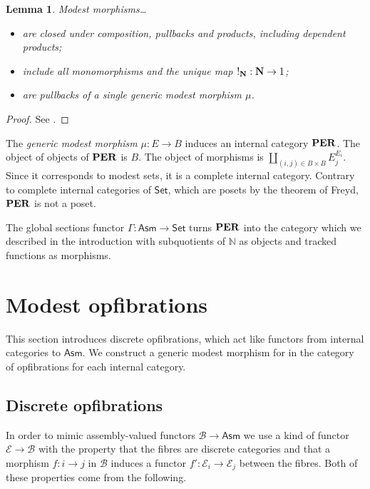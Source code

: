 \documentclass{amsart}
\theoremstyle{plain}
\newtheorem{lemma}[theorem]{Lemma}
\theoremstyle{definition}
\newcommand\hide[1]{}
\newcommand\cat\mathcal
\newcommand\Set{\mathsf{Set}}
\newcommand\N{\mathbb N}
\newcommand\Asm{\mathsf{Asm}}
\begin{document}
\begin{lemma} Modest morphisms\dots
\begin{itemize}
\item are closed under composition, pullbacks and products, including dependent products; 
\item include all monomorphisms and the unique map $!_\mathbf N:\mathbf N \to 1$;%
\item are pullbacks of a single \emph{generic modest morphism} $\mu$.
\end{itemize}\end{lemma}

\begin{proof} See \cite{MR1023803,MR2479466,MR1097022}.\hide{see Hyland, mainly} \end{proof}


The \emph{generic modest morphism} $\mu:E\to B$ induces an internal category $\mathbf{PER}$. The object of objects of $\mathbf{PER}$ is $B$. The object of morphisms is $\coprod_{(i,j)\in B\times B} E_j^{E_i}$. Since it corresponds to modest sets, it is a complete internal category. Contrary to complete internal categories of $\Set$, which are posets by the theorem of Freyd, $\mathbf{PER}$ is not a poset. \hide{cite Freyd!?}

The global sections functor $\Gamma:\Asm \to\Set$ turns $\mathbf{PER}$ into the category which we described in the introduction with subquotients of $\N$ as objects and tracked functions as morphisms.



\newcommand\simcat{{\mathord{\triangle}}}%
\newcommand\dual{^{op}}
\section{Modest opfibrations}
This section introduces discrete opfibrations, which act like functors from internal categories to $\Asm$. We construct a generic modest morphism for in the category of opfibrations for each internal category.

\subsection{Discrete opfibrations}
In order to mimic assembly-valued functors $\cat B \to \Asm$ we use a kind of functor $\cat E\to \cat B$ with the property that the fibres are discrete categories and that a morphism $f:i\to j$ in $\cat B$ induces a functor $f':\cat E_i\to\cat E_j$ between the fibres. Both of these properties come from the following.
\end{document}
